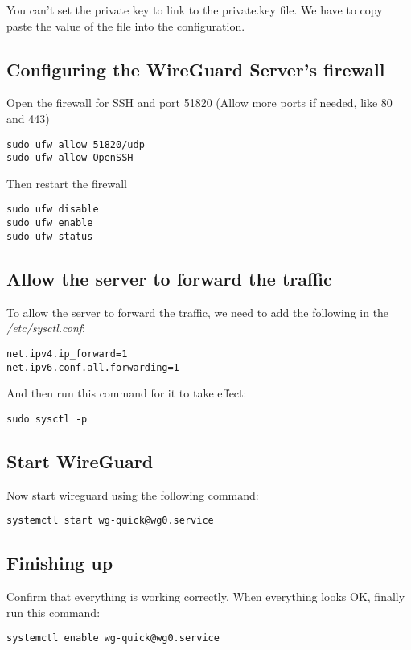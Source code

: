 \documentclass[letterpaper, 11pt]{article}
\begin{document}
You can't set the private key to link to the private.key file. We have to copy paste the value of the file into the configuration.

\subsection{Configuring the WireGuard Server's firewall}
\label{sec:orgce0c158}
Open the firewall for SSH and port 51820
(Allow more ports if needed, like 80 and 443)
\begin{verbatim}
sudo ufw allow 51820/udp
sudo ufw allow OpenSSH
\end{verbatim}

Then restart the firewall
\begin{verbatim}
sudo ufw disable
sudo ufw enable
sudo ufw status
\end{verbatim}

\subsection{Allow the server to forward the traffic}
\label{sec:org6980888}
To allow the server to forward the traffic, we need to add the following in the \textit{/etc/sysctl.conf}:

\begin{verbatim}
net.ipv4.ip_forward=1
net.ipv6.conf.all.forwarding=1
\end{verbatim}

And then run this command for it to take effect:
\begin{verbatim}
sudo sysctl -p
\end{verbatim}

\subsection{Start WireGuard}
\label{sec:org94c3943}
Now start wireguard using the following command:

\begin{verbatim}
systemctl start wg-quick@wg0.service
\end{verbatim}

\subsection{Finishing up}
\label{sec:org48db4e5}
Confirm that everything is working correctly.
When everything looks OK, finally run this command:

\begin{verbatim}
systemctl enable wg-quick@wg0.service
\end{verbatim}
\end{document}
